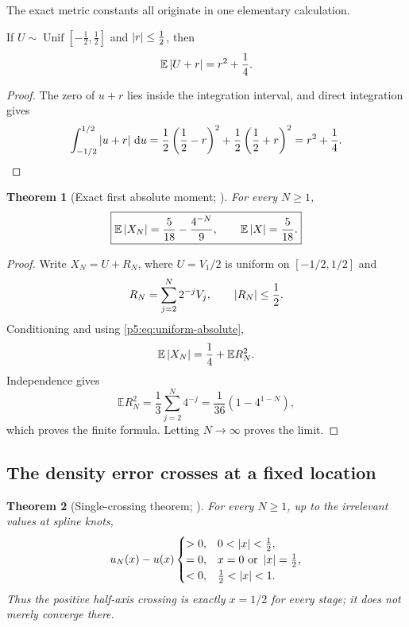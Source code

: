 \documentclass[11pt,oneside]{article}
\numberwithin{equation}{section}
\newtheorem{theorem}{Theorem}[section]
\theoremstyle{definition}
\theoremstyle{remark}
\newcommand{\E}{\mathbb E}
\newcommand{\dd}{\,\mathrm d}
\begin{document}
The exact metric constants all originate in one elementary calculation.

\begin{lemma}
If $U\sim\operatorname{Unif}[-\tfrac12,\tfrac12]$ and $\left\lvert r\right\rvert\le\tfrac12$, then
\begin{equation}
 \E\abs{U+r}=r^2+\frac14.
 \label{p5:eq:uniform-absolute}
\end{equation}
\end{lemma}

\begin{proof}
The zero of $u+r$ lies inside the integration interval, and direct integration gives
\[
 \int_{-1/2}^{1/2}\abs{u+r}\dd u
 =\frac12\left(\frac12-r\right)^2
  +\frac12\left(\frac12+r\right)^2
 =r^2+\frac14.
\]
\end{proof}

\begin{theorem}[Exact first absolute moment; \newresult]
For every $N\ge1$,
\begin{equation}
 \boxed{
 \E\abs{X_N}=\frac5{18}-\frac{4^{-N}}9,
 \qquad
 \E\abs X=\frac5{18}.}
 \label{p5:eq:absolute-moments}
\end{equation}
\end{theorem}

\begin{proof}
Write $X_N=U+R_N$, where $U=V_1/2$ is uniform on $[-1/2,1/2]$ and
\[
 R_N=\sum_{j=2}^{N}2^{-j}V_j,
 \qquad \left\lvert R_N\right\rvert\le\frac12.
\]
Conditioning and using \eqref{p5:eq:uniform-absolute},
\[
 \E\abs{X_N}=\frac14+\E R_N^2.
\]
Independence gives
\[
 \E R_N^2=\frac13\sum_{j=2}^{N}4^{-j}
 =\frac1{36}\left(1-4^{1-N}\right),
\]
which proves the finite formula.  Letting $N\to\infty$ proves the limit.
\end{proof}

\subsection{The density error crosses at a fixed location}

\begin{theorem}[Single-crossing theorem; \newresult]
For every $N\ge1$, up to the irrelevant values at spline knots,
\begin{equation}
 u_N(x)-u(x)
 \begin{cases}
 >0,&0<\left\lvert x\right\rvert<\tfrac12,\\
 =0,&x=0\text{ or }\left\lvert x\right\rvert=\tfrac12,\\
 <0,&\tfrac12<\left\lvert x\right\rvert<1.
 \end{cases}
 \label{p5:eq:single-crossing}
\end{equation}
Thus the positive half-axis crossing is exactly $x=1/2$ for every stage; it does not merely converge there.
\end{theorem}
\end{document}
